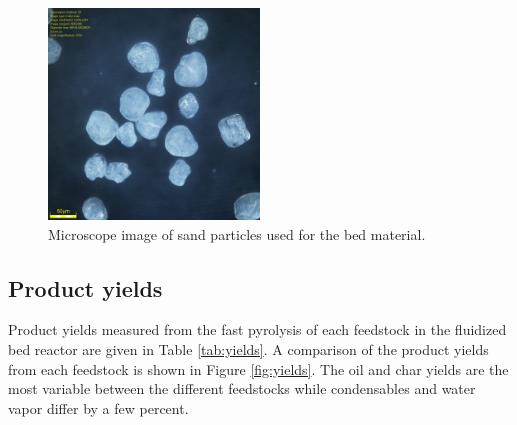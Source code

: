\documentclass[12pt,titlepage]{article}
\begin{document}
\begin{figure}[H]
    \centering
    \includegraphics[width=0.5\textwidth]{figures/sand.jpg}
    \caption{Microscope image of sand particles used for the bed material.}
    \label{fig:sand}
\end{figure}

\subsection{Product yields}

Product yields measured from the fast pyrolysis of each feedstock in the fluidized bed reactor are given in Table \ref{tab:yields}. A comparison of the product yields from each feedstock is shown in Figure \ref{fig:yields}. The oil and char yields are the most variable between the different feedstocks while condensables and water vapor differ by a few percent.
\end{document}

